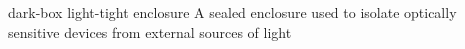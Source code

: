 \newglsXterm%
{dark-box}%
{light{\--}tight enclosure}%
{A sealed enclosure used to isolate optically sensitive devices from external sources of light}%
